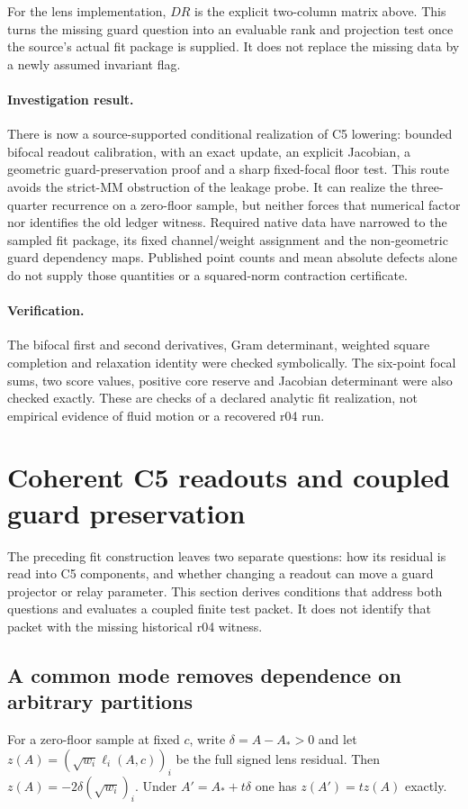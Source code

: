 \documentclass[11pt,a4paper]{article}
\begin{document}
For the lens implementation, $DR$ is the explicit two-column matrix
above. This turns the missing guard question into an evaluable rank and
projection test once the source's actual fit package is supplied. It does
not replace the missing data by a newly assumed invariant flag.

\paragraph{Investigation result.}
There is now a source-supported conditional realization of C5 lowering:
bounded bifocal readout calibration, with an exact update, an explicit
Jacobian, a geometric guard-preservation proof and a sharp fixed-focal
floor test. This route avoids the strict-MM obstruction of the leakage
probe. It can realize the three-quarter recurrence on a zero-floor sample,
but neither forces that numerical factor nor identifies the old ledger
witness. Required native data have narrowed to the sampled fit package,
its fixed channel/weight assignment and the non-geometric guard dependency
maps. Published point counts and mean absolute defects alone do not supply
those quantities or a squared-norm contraction certificate.

\paragraph{Verification.}
The bifocal first and second derivatives, Gram determinant, weighted square
completion and relaxation identity were checked symbolically. The six-point
focal sums, two score values, positive core reserve and Jacobian determinant
were also checked exactly. These are checks of a declared analytic fit
realization, not empirical evidence of fluid motion or a recovered r04 run.

\section{Coherent C5 readouts and coupled guard preservation}
\label{sec:coherent-c5-coupled-guards}
The preceding fit construction leaves two separate questions: how its
residual is read into C5 components, and whether changing a readout can
move a guard projector or relay parameter. This section derives conditions
that address both questions and evaluates a coupled finite test packet.
It does not identify that packet with the missing historical r04 witness.

\subsection{A common mode removes dependence on arbitrary partitions}
For a zero-floor sample at fixed $c$, write $\delta=A-A_*>0$ and let
$z(A)=(\sqrt{w_i}\ell_i(A,c))_i$ be the full signed lens residual.
Then $z(A)=-2\delta(\sqrt{w_i})_i$. Under
$A'=A_*+t\delta$ one has $z(A')=tz(A)$ exactly.
\end{document}
